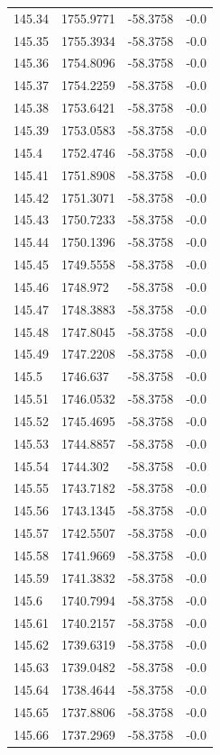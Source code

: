 \begin{table}[H]
\begin{tabular}{llll}
145.34 & 1755.9771 & -58.3758 & -0.0 \\
145.35 & 1755.3934 & -58.3758 & -0.0 \\
145.36 & 1754.8096 & -58.3758 & -0.0 \\
145.37 & 1754.2259 & -58.3758 & -0.0 \\
145.38 & 1753.6421 & -58.3758 & -0.0 \\
145.39 & 1753.0583 & -58.3758 & -0.0 \\
145.4 & 1752.4746 & -58.3758 & -0.0 \\
145.41 & 1751.8908 & -58.3758 & -0.0 \\
145.42 & 1751.3071 & -58.3758 & -0.0 \\
145.43 & 1750.7233 & -58.3758 & -0.0 \\
145.44 & 1750.1396 & -58.3758 & -0.0 \\
145.45 & 1749.5558 & -58.3758 & -0.0 \\
145.46 & 1748.972 & -58.3758 & -0.0 \\
145.47 & 1748.3883 & -58.3758 & -0.0 \\
145.48 & 1747.8045 & -58.3758 & -0.0 \\
145.49 & 1747.2208 & -58.3758 & -0.0 \\
145.5 & 1746.637 & -58.3758 & -0.0 \\
145.51 & 1746.0532 & -58.3758 & -0.0 \\
145.52 & 1745.4695 & -58.3758 & -0.0 \\
145.53 & 1744.8857 & -58.3758 & -0.0 \\
145.54 & 1744.302 & -58.3758 & -0.0 \\
145.55 & 1743.7182 & -58.3758 & -0.0 \\
145.56 & 1743.1345 & -58.3758 & -0.0 \\
145.57 & 1742.5507 & -58.3758 & -0.0 \\
145.58 & 1741.9669 & -58.3758 & -0.0 \\
145.59 & 1741.3832 & -58.3758 & -0.0 \\
145.6 & 1740.7994 & -58.3758 & -0.0 \\
145.61 & 1740.2157 & -58.3758 & -0.0 \\
145.62 & 1739.6319 & -58.3758 & -0.0 \\
145.63 & 1739.0482 & -58.3758 & -0.0 \\
145.64 & 1738.4644 & -58.3758 & -0.0 \\
145.65 & 1737.8806 & -58.3758 & -0.0 \\
145.66 & 1737.2969 & -58.3758 & -0.0 \\

\end{tabular}
\end{table}
